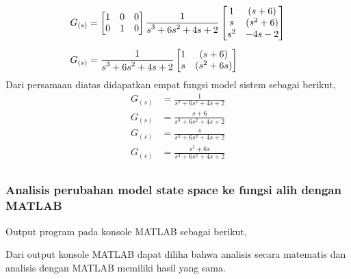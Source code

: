 \documentclass[../main.tex]{subfiles}
\begin{document}
\begin{equation}
\begin{split}
                        G_{(s)} &= \begin{bmatrix} 1 & 0 & 0 \\  0 & 1 & 0 \end{bmatrix} \frac{\displaystyle 1}{\displaystyle s^3+6s^2+4s+2} \begin{bmatrix} 1 & (s+6) \\ s & (s^2 + 6) \\ s^2 & -4s-2 \end{bmatrix} \\[5pt]
                        G_{(s)} &= \frac{\displaystyle 1}{\displaystyle s^3 + 6s^2 + 4s + 2} \begin{bmatrix} 1 & (s+6) \\ s & (s^2+6s) \end{bmatrix}
                    \end{split}
                \end{equation}
                Dari persamaan diatas didapatkan empat fungsi model sistem sebagai berikut,
                \begin{equation}
                    \begin{split}
                        G_{(s)} &= \frac{1}{s^3 + 6s^2 + 4s + 2}\\[5pt]
                        G_{(s)} &= \frac{s+6}{s^3 + 6s^2 + 4s + 2}\\[5pt]
                        G_{(s)} &= \frac{s}{s^3 + 6s^2 + 4s + 2}\\[5pt]
                        G_{(s)} &= \frac{s^2+6s}{s^3 + 6s^2 + 4s + 2}\\[5pt]
                    \end{split}
                \end{equation}
            \subsubsection{Analisis perubahan model state space ke fungsi alih dengan MATLAB}
                
            Output program pada konsole MATLAB sebagai berikut,
                
            Dari output konsole MATLAB dapat diliha bahwa analisis secara matematis dan analisis dengan MATLAB memiliki hasil yang sama.
\end{document}
